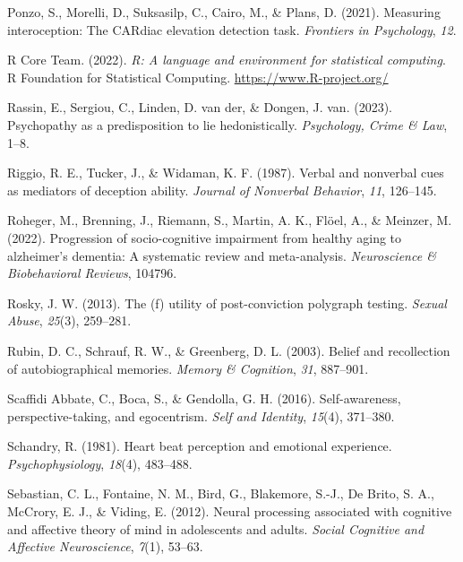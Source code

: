 \documentclass[
  man,mask,floatsintext]{apa6}
\newlength{\cslhangindent}
\newlength{\cslentryspacingunit} %
\newenvironment{CSLReferences}[2] %
 {%
  \setlength{\parindent}{0pt}
  \ifodd #1
  \let\oldpar\par
  \def\par{\hangindent=\cslhangindent\oldpar}
  \fi
  \setlength{\parskip}{#2\cslentryspacingunit}
 }%
 {}
\begin{document}
\begin{CSLReferences}{1}{0}
\leavevmode{}%
Ponzo, S., Morelli, D., Suksasilp, C., Cairo, M., \& Plans, D. (2021). Measuring interoception: The CARdiac elevation detection task. \emph{Frontiers in Psychology}, \emph{12}.

\leavevmode{}%
R Core Team. (2022). \emph{R: A language and environment for statistical computing}. R Foundation for Statistical Computing. \url{https://www.R-project.org/}

\leavevmode{}%
Rassin, E., Sergiou, C., Linden, D. van der, \& Dongen, J. van. (2023). Psychopathy as a predisposition to lie hedonistically. \emph{Psychology, Crime \& Law}, 1--8.

\leavevmode{}%
Riggio, R. E., Tucker, J., \& Widaman, K. F. (1987). Verbal and nonverbal cues as mediators of deception ability. \emph{Journal of Nonverbal Behavior}, \emph{11}, 126--145.

\leavevmode{}%
Roheger, M., Brenning, J., Riemann, S., Martin, A. K., Flöel, A., \& Meinzer, M. (2022). Progression of socio-cognitive impairment from healthy aging to alzheimer's dementia: A systematic review and meta-analysis. \emph{Neuroscience \& Biobehavioral Reviews}, 104796.

\leavevmode{}%
Rosky, J. W. (2013). The (f) utility of post-conviction polygraph testing. \emph{Sexual Abuse}, \emph{25}(3), 259--281.

\leavevmode{}%
Rubin, D. C., Schrauf, R. W., \& Greenberg, D. L. (2003). Belief and recollection of autobiographical memories. \emph{Memory \& Cognition}, \emph{31}, 887--901.

\leavevmode{}%
Scaffidi Abbate, C., Boca, S., \& Gendolla, G. H. (2016). Self-awareness, perspective-taking, and egocentrism. \emph{Self and Identity}, \emph{15}(4), 371--380.

\leavevmode{}%
Schandry, R. (1981). Heart beat perception and emotional experience. \emph{Psychophysiology}, \emph{18}(4), 483--488.

\leavevmode{}%
Sebastian, C. L., Fontaine, N. M., Bird, G., Blakemore, S.-J., De Brito, S. A., McCrory, E. J., \& Viding, E. (2012). Neural processing associated with cognitive and affective theory of mind in adolescents and adults. \emph{Social Cognitive and Affective Neuroscience}, \emph{7}(1), 53--63.


\end{CSLReferences}
\end{document}
